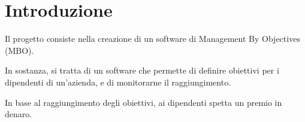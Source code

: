 \section*{Introduzione}

Il progetto consiste nella creazione di un software di Management By Objectives (MBO).

In sostanza, si tratta di un software che permette di definire obiettivi per i dipendenti di un'azienda, e di monitorarne il raggiungimento.

In base al raggiungimento degli obiettivi, ai dipendenti spetta un premio in denaro.